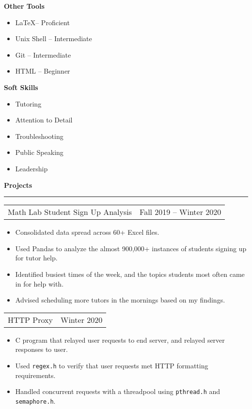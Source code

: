 \documentclass{article}
\newenvironment{compactItemize}{
  \begin{itemize}[itemsep=0ex, parsep=0ex, partopsep=0ex, topsep= -7pt]
}{
  \end{itemize}
}
\newcommand{\project}[2]{
  \begingroup
  \setlength{\tabcolsep}{0ex}
  \begin{tabularx}{\linewidth}{X r}
    #1 & %
    #2\\ %
  \end{tabularx}%
  \endgroup%
}
\begin{document}
\textbf{Other Tools}
\begin{multicols}{2}
  \begin{compactItemize}
    \item \LaTeX -- Proficient
    \item Unix Shell -- Intermediate
    \item Git -- Intermediate
    \item HTML -- Beginner
  \end{compactItemize}
\end{multicols}

\textbf{Soft Skills}
\begin{multicols}{2}
  \begin{compactItemize}
    \item Tutoring
    \item Attention to Detail
    \item Troubleshooting 
    \item Public Speaking 
    \item Leadership
  \end{compactItemize}
\end{multicols}
\medskip

\textbf{Projects %
}
\smallskip
\hrule

\project{Math Lab Student Sign Up Analysis}{Fall 2019 -- Winter 2020}
\begin{compactItemize}
  \item Consolidated data spread across 60+ Excel files.
  \item Used Pandas to analyze the almost 900,000+ instances of students signing up for tutor help.
  \item Identified busiest times of the week, and the topics students most often came in for help with.
  \item Advised scheduling more tutors in the mornings based on my findings.
\end{compactItemize}
\medskip

\project{HTTP Proxy}{Winter 2020}
\begin{compactItemize}
  \item C program that relayed user requests to end server, and relayed server responses to user.
  \item Used \texttt{regex.h} to verify that user requests met HTTP formatting requirements.
  \item Handled concurrent requests with a threadpool using \texttt{pthread.h} and \texttt{semaphore.h}.
\end{compactItemize}
\medskip
\end{document}
